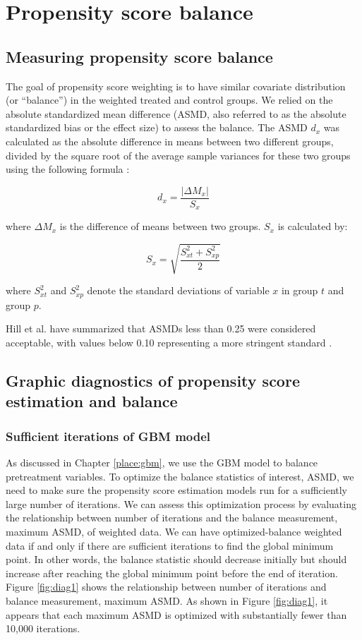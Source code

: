 \documentclass[12pt]{report}
\begin{document}
\chapter{Propensity score balance}
\section{Measuring propensity score balance}
The goal of propensity score weighting is to have similar covariate distribution (or ``balance'') in the weighted treated and control groups. We relied on the absolute standardized mean difference (ASMD, also referred to as the absolute standardized bias or the effect size) to assess the balance. The ASMD $d_x$ was calculated as the absolute difference in means between two different groups, divided by the square root of the average sample variances for these two groups using the following formula \citep{haviland2007combining}:

\begin{equation*}
d_x =\frac{|\Delta M_x|}{S_x}
\end{equation*}

where $\Delta M_x$ is the difference of means between two groups. $S_x$ is calculated by: 

\begin{equation*}
S_x=\sqrt{\frac{S^2_{xt}+S^2_{xp}}{2}}
\end{equation*}

where $S^2_{xt}$ and $S^2_{xp}$ denote the standard deviations of variable $x$ in group $t$ and group $p$.

Hill et al. have summarized that ASMDs less than 0.25 were considered acceptable, with values below 0.10 representing a more stringent standard \citep{hillm2015short}.

\section{Graphic diagnostics of propensity score estimation and balance}

\subsection{Sufficient iterations of GBM model}
As discussed in Chapter \ref{place:gbm}, we use the GBM model to balance pretreatment variables. To optimize the balance statistics of interest, ASMD, we need to make sure the propensity score estimation models run for a sufficiently large number of iterations. We can assess this optimization process by evaluating the relationship between number of iterations and the balance measurement, maximum ASMD, of weighted data. We can have optimized-balance weighted data if and only if there are sufficient iterations to find the global minimum point. In other words, the balance statistic should decrease initially but should increase after reaching the global minimum point before the end of iteration. Figure \ref{fig:diag1} shows the relationship between number of iterations and balance measurement, maximum ASMD. As shown in Figure \ref{fig:diag1}, it appears that each maximum ASMD is optimized with substantially fewer than 10,000 iterations.
\end{document}
